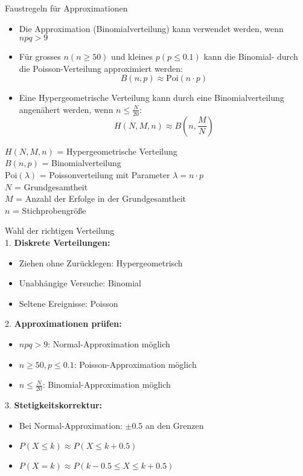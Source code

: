 \begin{corollary}{Faustregeln für Approximationen}
\begin{itemize}
  \item Die Approximation (Binomialverteilung) kann verwendet werden, wenn $npq > 9$
  \item Für grosses $n(n \geq 50)$ und kleines $p(p \leq 0.1)$ kann die Binomial- durch die Poisson-Verteilung approximiert werden:
  $$
  B(n,p) \approx \text{Poi}(n \cdot p)
  $$
  
  \item Eine Hypergeometrische Verteilung kann durch eine Binomialverteilung angenähert werden, wenn $n \leq \frac{N}{20}$:
  $$
  H(N,M,n) \approx B(n,\frac{M}{N})
  $$
\end{itemize}
\end{corollary}

\begin{remark}
    $H(N,M,n)$ = Hypergeometrische Verteilung\\
    $B(n,p)$ = Binomialverteilung\\
    $\text{Poi}(\lambda)$ = Poissonverteilung mit Parameter $\lambda = n \cdot p$\\
    $N$ = Grundgesamtheit\\
    $M$ = Anzahl der Erfolge in der Grundgesamtheit\\
    $n$ = Stichprobengröße
\end{remark}

\begin{KR}{Wahl der richtigen Verteilung}\\
1. \textbf{Diskrete Verteilungen:}
   \begin{itemize}
   \item Ziehen ohne Zurücklegen: Hypergeometrisch
   \item Unabhängige Versuche: Binomial
   \item Seltene Ereignisse: Poisson
   \end{itemize}

2. \textbf{Approximationen prüfen:}
   \begin{itemize}
   \item $npq > 9$: Normal-Approximation möglich
   \item $n \geq 50, p \leq 0.1$: Poisson-Approximation möglich
   \item $n \leq \frac{N}{20}$: Binomial-Approximation möglich
   \end{itemize}

3. \textbf{Stetigkeitskorrektur:}
   \begin{itemize}
   \item Bei Normal-Approximation: $\pm 0.5$ an den Grenzen
   \item $P(X \leq k) \approx P(X \leq k + 0.5)$
   \item $P(X = k) \approx P(k - 0.5 \leq X \leq k + 0.5)$
   \end{itemize}
\end{KR}

